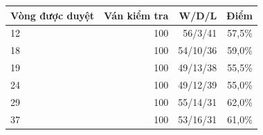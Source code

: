 \begin{center}\small
\begin{tabular}{@{}lrrr@{}}
\toprule
Vòng được duyệt & Ván kiểm tra & W/D/L & Điểm \\
\midrule
12 & 100 & 56/3/41 & 57,5\% \\
18 & 100 & 54/10/36 & 59,0\% \\
19 & 100 & 49/13/38 & 55,5\% \\
24 & 100 & 49/12/39 & 55,0\% \\
29 & 100 & 55/14/31 & 62,0\% \\
37 & 100 & 53/16/31 & 61,0\% \\
\bottomrule
\end{tabular}
\end{center}